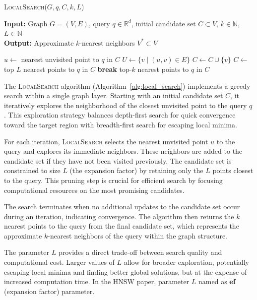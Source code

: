 \documentclass{article}
\begin{document}
\begin{algorithm}
\caption{\textsc{LocalSearch}($G, q, C, k, L$)}\label{alg:local_search}
\textbf{Input:} Graph $G = (V, E)$, query $q \in \mathbb{R}^d$, initial candidate set $C \subset V$, $k \in \mathbb{N}$, $L \in \mathbb{N}$ \\
\textbf{Output:} Approximate $k$-nearest neighbors $V^* \subset V$
\begin{algorithmic}[1]
    \State $u \gets$ nearest unvisited point to $q$ in $C$
    \State $U \gets \{v \mid (u, v) \in E\}$
            \State $C \gets C \cup \{v\}$
        \EndIf
    \EndFor
        \State $C \gets$ top $L$ nearest points to $q$ in $C$
    \EndIf
        \State \textbf{break}
    \EndIf
\EndWhile
\State \Return top-$k$ nearest points to $q$ in $C$
\end{algorithmic}
\end{algorithm}

The \textsc{LocalSearch} algorithm (Algorithm~\ref{alg:local_search}) implements a greedy search within a single graph layer. Starting with an initial candidate set $C$, it iteratively explores the neighborhood of the closest unvisited point to the query $q$. This exploration strategy balances depth-first search for quick convergence toward the target region with breadth-first search for escaping local minima.

For each iteration, \textsc{LocalSearch} selects the nearest unvisited point $u$ to the query and explores its immediate neighbors. These neighbors are added to the candidate set if they have not been visited previously. The candidate set is constrained to size $L$ (the expansion factor) by retaining only the $L$ points closest to the query. This pruning step is crucial for efficient search by focusing computational resources on the most promising candidates.

The search terminates when no additional updates to the candidate set occur during an iteration, indicating convergence. The algorithm then returns the $k$ nearest points to the query from the final candidate set, which represents the approximate $k$-nearest neighbors of the query within the graph structure.

The parameter $L$ provides a direct trade-off between search quality and computational cost. Larger values of $L$ allow for broader exploration, potentially escaping local minima and finding better global solutions, but at the expense of increased computation time. In the HNSW paper, parameter $L$ named as \textbf{ef} (expansion factor) parameter.
\end{document}
